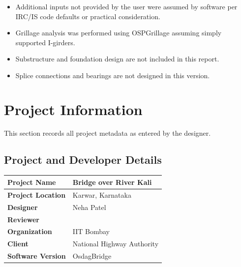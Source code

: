 \documentclass[12pt,a4paper]{report}
\numberwithin{table}{chapter}
\numberwithin{figure}{chapter}
\begin{document}
\begin{itemize}
\item Additional inputs not provided by the user were assumed by software per IRC/IS code defaults or practical consideration.
\item Grillage analysis was performed using OSPGrillage assuming simply supported I-girders.
\item Substructure and foundation design are not included in this report.
\item Splice connections and bearings are not designed in this version.
\end{itemize}

\titleformat{\chapter}[block]{\normalfont\Large\bfseries\centering}{\thechapter}{1em}{}
\titlespacing*{\chapter}{0pt}{-30pt}{10pt}


\chapter{Project Information}

This section records all project metadata as entered by the designer.

\section{Project and Developer Details}
\label{sec:project-details}

\begin{tabular}{|L{5.5cm}|L{8.5cm}|}
\hline
\textbf{Project Name} & Bridge over River Kali \\
\hline
\textbf{Project Location} & Karwar, Karnataka \\
\hline
\textbf{Designer} & Neha Patel \\
\hline
\textbf{Reviewer} &  \\
\hline
\textbf{Organization} & IIT Bombay \\
\hline
\textbf{Client} & National Highway Authority \\
\hline
\textbf{Software Version} & OsdagBridge \\
\hline
\end{tabular}
\end{document}
